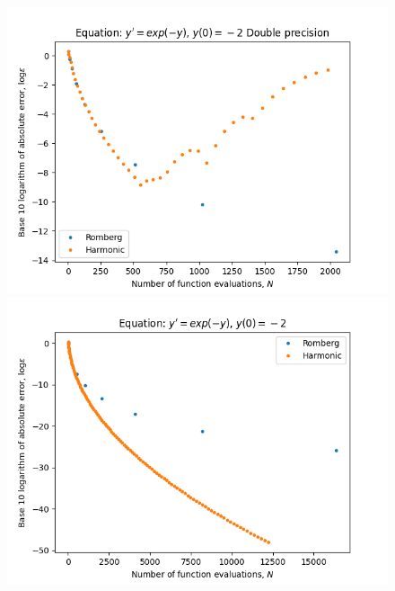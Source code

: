 \begin{figure}[H]
\centering
\begin{minipage}{0.45\textwidth}
\centering
\includegraphics[scale=0.45]{../results/emr_plots/ln_em2.png}
\end{minipage}
\begin{minipage}{0.45\textwidth}
\centering
\includegraphics[scale=0.45]{../results/emr_plots/ln_em2_hp.png}
\end{minipage}
\end{figure}

